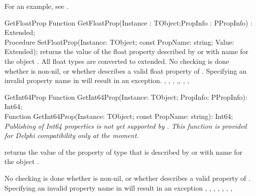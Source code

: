 For an example, see .

\begin{function}{GetFloatProp}
\Declaration
Function GetFloatProp(Instance : TObject;PropInfo : PPropInfo) : Extended;\\
Procedure SetFloatProp(Instance: TObject; const PropName: string; Value: Extended);
\Description
{} returns the value of the float property described by 
 or with name  for the object . 
All float types are converted
to extended.
\Errors
No checking is done whether  is non-nil, or whether
 describes a valid float property of .
Specifying an invalid property name in  will result in an
 exception.
\SeeAlso
{}, , ,
,, ,
, 
\end{function}


\begin{function}{GetInt64Prop}
\Declaration
Function GetInt64Prop(Instance: TObject; PropInfo: PPropInfo): Int64;\\
Function GetInt64Prop(Instance: TObject; const PropName: string): Int64;
\Description
{\em Publishing of Int64 properties is not yet supported by \fpc. This
function is provided for Delphi compatibility only at the moment.}

 returns the value of the property of type
 that is described by  or with name  
for the object .

\Errors
No checking is done whether  is non-nil, or whether
 describes a valid  property of .
Specifying an invalid property name in  will result in an
 exception
\SeeAlso
{}, , ,
, , ,
, 
\end{function}


